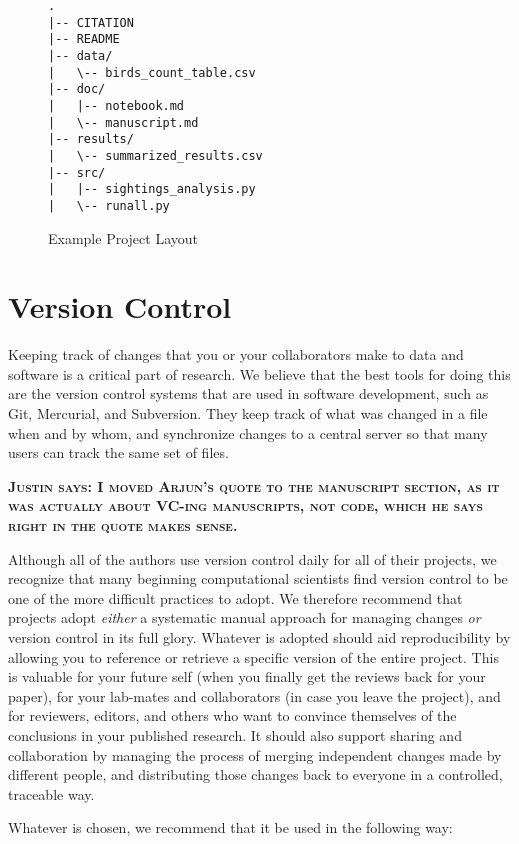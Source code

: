 \documentclass[10pt]{article}
\newcommand{\fixme}[1]{\textsc{\textbf{#1}}}
\begin{document}
\begin{figure}
\begin{verbatim}
.
|-- CITATION
|-- README
|-- data/
|   \-- birds_count_table.csv
|-- doc/
|   |-- notebook.md
|   \-- manuscript.md
|-- results/
|   \-- summarized_results.csv
|-- src/
|   |-- sightings_analysis.py
|   \-- runall.py
\end{verbatim}
\caption{Example Project Layout}
\label{fig:layout}
\end{figure}

\section{Version Control}\label{sec:versioning}

Keeping track of changes that you or your collaborators make to data
and software is a critical part of research.  We believe that the best
tools for doing this are the version control systems that are used in
software development, such as Git, Mercurial, and Subversion.  They
keep track of what was changed in a file when and by whom, and
synchronize changes to a central server so that many users can track
the same set of files.

\fixme{Justin says: I moved Arjun's quote to the manuscript section, as it
was actually about VC-ing manuscripts, not code, which he says right in 
the quote makes sense.}

Although all of the authors use version control daily for all of their
projects, we recognize that many beginning computational scientists
find version control to be one of the more difficult practices to adopt.
We therefore recommend that projects adopt \emph{either} a systematic
manual approach for managing changes \emph{or} version control in its
full glory.  Whatever is adopted should aid reproducibility by
allowing you to reference or retrieve a specific version of the entire
project. This is valuable for your future self (when you finally get
the reviews back for your paper), for your lab-mates and collaborators
(in case you leave the project), and for reviewers, editors, and
others who want to convince themselves of the conclusions in your
published research.  It should also support sharing and collaboration
by managing the process of merging independent changes made by
different people, and distributing those changes back to everyone in a
controlled, traceable way.

Whatever is chosen, we recommend that it be used in the following way:
\end{document}
